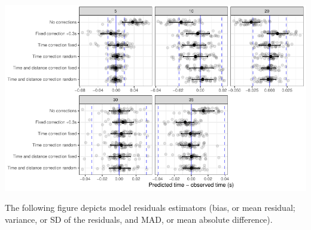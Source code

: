 \documentclass[fleqn,10pt,lineno]{wlpeerj} %
\begin{document}
\begin{center}\includegraphics[width=1\linewidth]{paper_files/figure-latex/unnamed-chunk-65-1} \end{center}

The following figure depicts model residuals estimators (bias, or mean residual; variance, or SD of the residuals, and MAD, or mean absolute difference).
\end{document}
